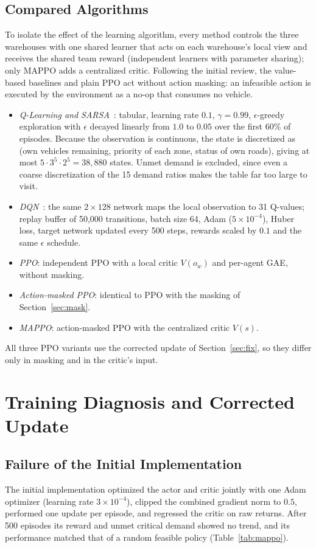 \documentclass[conference]{IEEEtran}
\begin{document}
\subsection{Compared Algorithms}
\label{sec:algos}
To isolate the effect of the learning algorithm, every method controls the three warehouses with one shared learner that acts on each warehouse's local view and receives the shared team reward (independent learners with parameter sharing); only MAPPO adds a centralized critic. Following the initial review, the value-based baselines and plain PPO act without action masking: an infeasible action is executed by the environment as a no-op that consumes no vehicle.
\begin{itemize}
\item \emph{Q-Learning and SARSA}~\cite{b11}: tabular, learning rate $0.1$, $\gamma=0.99$, $\epsilon$-greedy exploration with $\epsilon$ decayed linearly from $1.0$ to $0.05$ over the first 60\% of episodes. Because the observation is continuous, the state is discretized as (own vehicles remaining, priority of each zone, status of own roads), giving at most $5\cdot3^{5}\cdot2^{5}=38{,}880$ states. Unmet demand is excluded, since even a coarse discretization of the 15 demand ratios makes the table far too large to visit.
\item \emph{DQN}~\cite{b10}: the same $2\times128$ network maps the local observation to 31 Q-values; replay buffer of 50{,}000 transitions, batch size 64, Adam ($5\times10^{-4}$), Huber loss, target network updated every 500 steps, rewards scaled by $0.1$ and the same $\epsilon$ schedule.
\item \emph{PPO}: independent PPO with a local critic $V(o_w)$ and per-agent GAE, without masking.
\item \emph{Action-masked PPO}: identical to PPO with the masking of Section~\ref{sec:mask}.
\item \emph{MAPPO}: action-masked PPO with the centralized critic $V(s)$.
\end{itemize}
All three PPO variants use the corrected update of Section~\ref{sec:fix}, so they differ only in masking and in the critic's input.

\section{Training Diagnosis and Corrected Update}
\subsection{Failure of the Initial Implementation}
The initial implementation optimized the actor and critic jointly with one Adam optimizer (learning rate $3\times10^{-4}$), clipped the combined gradient norm to $0.5$, performed one update per episode, and regressed the critic on raw returns. After 500 episodes its reward and unmet critical demand showed no trend, and its performance matched that of a random feasible policy (Table~\ref{tab:mappo}).
\end{document}

